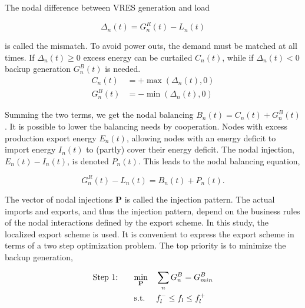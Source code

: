 \documentclass[a4paper, 12pt, sort&compress]{elsarticle}%
\newcommand{\paren}[1]{\left(#1\right)}
\begin{document}
The nodal difference between VRES generation and load

\begin{equation}
  \Delta_{n}(t) = G^{R}_{n}(t) - L_{n}(t)
\end{equation}

is called the mismatch. To avoid power outs, the demand must be
matched at all times. If $\Delta_{n}(t) \geq 0$ excess energy can be
curtailed $C_{n}(t)$, while if $\Delta_{n}(t) < 0$ backup generation $G^{B}_{n}(t)$ is
needed.
\begin{align}
  C_{n}(t) &= + \max \paren{\Delta_{n}(t),0} \\
  G^{B}_{n}(t) &= - \min \phantom{} \paren{\Delta_{n}(t),0} 
\end{align}

Summing the two terms, we get the nodal balancing
$B_{n}(t) = C_{n}(t) + G^{B}_{n}(t)$.  It is possible to lower the
balancing needs by cooperation. Nodes with excess production export
energy $E_{n}(t)$, allowing nodes with an energy deficit to import
energy $I_{n}(t)$ to (partly) cover their energy deficit. The nodal
injection, $E_{n}(t) - I_{n}(t)$, is denoted $P_{n}(t)$. This leads to
the nodal balancing equation,

\begin{equation}
  \label{eq:nodal-balancing}
  G^{R}_{n}(t) - L_{n}(t) = B_{n}(t) + P_{n}(t) .
\end{equation}

The vector of nodal injections $\mathbf{P}$ is called the injection
pattern. The actual imports and exports, and thus the injection pattern,
depend on the business rules of the nodal interactions defined by the
export scheme. In this study, the localized export scheme is
used. It is convenient to express the export scheme in terms of a two
step optimization problem. The top priority is to minimize the backup
generation,

\begin{equation}
  \label{eq:step1}
  \begin{aligned}
    \text{Step 1: \hspace{15pt}}& \underset{\mathbf{P}}{\text{min}}
    & & \sum_{n} G_{n}^{B} = G^{B}_{min} \\
    & \text{s.t.}
    & & f_{l}^{-} \leq f_{l} \leq f_{l}^{+}
  \end{aligned}
\end{equation}
\end{document}
